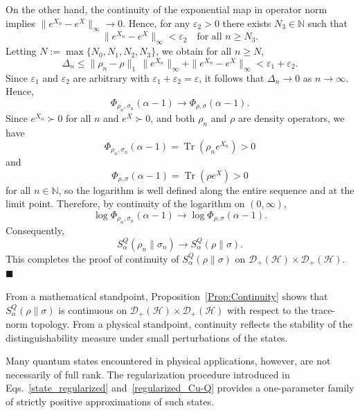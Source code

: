 \documentclass[a4paper, amsfonts, amssymb, amsmath, reprint, showkeys, nofootinbib, twoside, aps, pra]{revtex4-2}
\theoremstyle{definition}
\renewenvironment{proof}{\noindent{\bfseries Proof.}}{\hfill$\blacksquare$}
\begin{document}
\begin{proof}
On the other hand, the continuity of the exponential map in operator norm implies
$\|e^{X_n}-e^{X}\|_{\infty}\to 0$. Hence, for any $\varepsilon_2>0$ there exists 
$N_3\in\mathbb{N}$ such that
\begin{equation}
    \|e^{X_n}-e^{X}\|_{\infty} < \varepsilon_2
    \quad \text{for all } n\ge N_3.
\end{equation}
Letting $N := \max\{N_0, N_1, N_2, N_3\}$, we obtain for all $n\ge N$,
\begin{equation}
    \Delta_n \le \|\rho_n-\rho\|_1\,\|e^{X_n}\|_{\infty}+
    \|e^{X_n}-e^{X}\|_{\infty}<\varepsilon_1+\varepsilon_2.
\end{equation}
Since $\varepsilon_1$ and $\varepsilon_2$ are arbitrary with
$\varepsilon_1+\varepsilon_2=\varepsilon$, it follows that
$\Delta_n\to 0$ as $n\to\infty$. Hence,
\[
    \Phi_{\rho_n,\sigma_n}(\alpha-1)
    \longrightarrow
    \Phi_{\rho,\sigma}(\alpha-1).
\]
Since $e^{X_n}\succ 0$ for all $n$ and $e^X\succ 0$, and both $\rho_n$ and $\rho$
are density operators, we have
\begin{equation}
    \Phi_{\rho_n,\sigma_n}(\alpha-1)=\operatorname{Tr}(\rho_n e^{X_n})>0
\end{equation}
and
\begin{equation}
     \Phi_{\rho,\sigma}(\alpha-1)=\operatorname{Tr}(\rho e^{X})>0
\end{equation}
for all $n\in\mathbb{N}$, so the logarithm is well defined along the entire sequence and at the limit point. Therefore, by continuity of the logarithm on
\((0,\infty)\),
\[
\log\Phi_{\rho_n,\sigma_n}(\alpha-1)
\longrightarrow
\log\Phi_{\rho,\sigma}(\alpha-1).
\]
Consequently,
\[
S_\alpha^Q(\rho_n\|\sigma_n)
\longrightarrow
S_\alpha^Q(\rho\|\sigma).
\]
This completes the proof of continuity of $S^Q_\alpha(\rho\|\sigma)$
on $\mathcal{D}_+(\mathcal{H}) \times \mathcal{D}_+(\mathcal{H})$.
\end{proof}

From a mathematical standpoint, Proposition~\ref{Prop:Continuity}
shows that \(S_\alpha^Q(\rho\|\sigma)\) is continuous on
\(
\mathcal D_+(\mathcal H)\times\mathcal D_+(\mathcal H)
\)
with respect to the trace-norm topology. From a physical standpoint, continuity reflects the stability of the distinguishability measure under small perturbations of the states.

Many quantum states encountered in physical applications, however, are not necessarily of full rank. The regularization procedure introduced in Eqs.~\eqref{state_regularized}
and~\eqref{regularized_Cu-Q}
provides a one-parameter family of strictly positive
approximations of such states.
\end{document}
